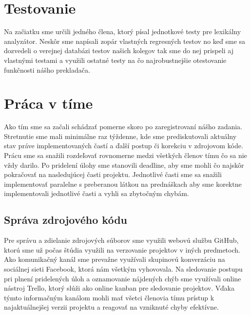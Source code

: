 \documentclass{article}
\begin{document}
    \section{Testovanie}
    Na začiatku sme určili jedného člena, ktorý písal jednotkové testy pre lexikálny analyzátor. 
    Neskôr sme napísali zopár vlastných regresných testov no keď sme sa dozvedeli o verejnej 
    databázi testov našich kolegov tak sme do nej prispeli aj vlastnými testami a využili 
    ostatné testy na čo najrobustnejšie otestovanie funkčnosti nášho prekladača.
    
    \section{Práca v tíme}
    Ako tím sme sa začali schádzať pomerne skoro po zaregistrovaní nášho zadania. Stretnutie sme mali 
    minimálne raz týždenne, kde sme prediskutovali aktuálny stav práve implementovaných častí 
    a ďalší postup či korekciu v zdrojovom kóde. Prácu sme sa snažili rozdeľovať rovnomerne medzi 
    všetkých členov tímu čo sa nie vždy darilo. Po pridelení úlohy sme stanovili deadline, aby sme 
    mohli čo najskôr pokračovať na nasledujúcej časti projektu. Jednotlivé časti sme sa snažili 
    implementovať paralelne s preberanou látkou na prednáškach aby sme korektne implementovali
    jednotlivé časti a vyhli sa zbytočným chybám.

        \subsection{Správa zdrojového kódu}
        Pre správu a zdielanie zdrojových súborov sme využili webovú službu GitHub, ktorú sme už 
        počas štúdia využili na verzovanie projektov v iných predmetoch. Ako komunikačný kanál sme 
        prevažne využívali skupinovú konverzáciu na sociálnej sieti Facebook, ktorá nám všetkým 
        vyhovovala. Na sledovanie postupu pri plnení pridelených úloh a oznamovanie nájdených chýb 
        sme využívali online nástroj Trello, ktorý slúži ako online kanban pre sledovanie projektov. 
        Vďaka týmto informačným kanálom mohli mať všetci členovia tímu prístup k najaktuálnejšej
        verzii projektu a reagovať na vzniknuté chyby efektívne.

        \newpage
\end{document}
